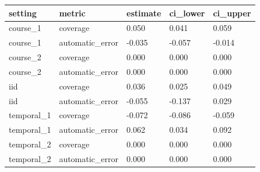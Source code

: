 \begin{tabular}{lllll}
\toprule
setting & metric & estimate & ci\_lower & ci\_upper\\
\midrule
course\_1 & coverage & 0.050 & 0.041 & 0.059\\
course\_1 & automatic\_error & -0.035 & -0.057 & -0.014\\
course\_2 & coverage & 0.000 & 0.000 & 0.000\\
course\_2 & automatic\_error & 0.000 & 0.000 & 0.000\\
iid & coverage & 0.036 & 0.025 & 0.049\\
iid & automatic\_error & -0.055 & -0.137 & 0.029\\
temporal\_1 & coverage & -0.072 & -0.086 & -0.059\\
temporal\_1 & automatic\_error & 0.062 & 0.034 & 0.092\\
temporal\_2 & coverage & 0.000 & 0.000 & 0.000\\
temporal\_2 & automatic\_error & 0.000 & 0.000 & 0.000\\
\bottomrule
\end{tabular}